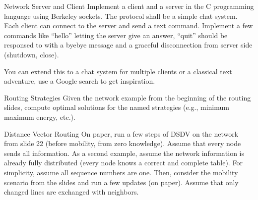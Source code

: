 \documentclass[twoside]{article}
\begin{document}
\maketitle

\begin{task}{Network Server and Client}{}{}
  Implement a client and a server in the C programming language using Berkeley sockets. The protocol shall be a simple
  chat system. Each client can connect to the server and send a text command. Implement a few commands like
  ``hello'' letting the server give an answer, ``quit'' should be responsed to with a byebye message and a graceful disconnection from server side (shutdown, close).

  You can extend this to a chat system for multiple clients or a classical text adventure, use a Google search to get inspiration.
\end{task}

\begin{task}{Routing Strategies}{}{}
  Given the network example from the beginning of the routing slides, compute optimal solutions for the named strategies (e.g., minimum maximum energy, etc.).
\end{task}

\begin{task}{Distance Vector Routing}{}{}
  On paper, run a few steps of DSDV on the network from slide 22 (before mobility, from zero knowledge). Assume that every node sends all information. As a second example, assume the network information is already fully distributed (every node knows a correct and complete table). For simplicity, assume all sequence numbers are one. Then, consider the mobility scenario from the slides and run a few updates (on paper). Assume that only changed lines are exchanged with neighbors.
\end{task}
\end{document}
